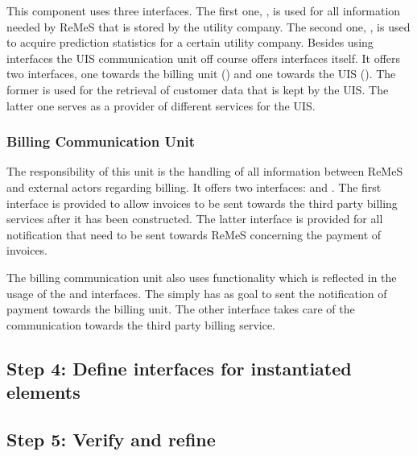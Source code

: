 \npar This component uses three interfaces. The first one, , is
used for all information needed by ReMeS that is stored by the utility
company. The second one, , is used to acquire prediction
statistics for a certain utility company. Besides using interfaces the UIS
communication unit off course offers interfaces itself. It offers two
interfaces, one towards the billing unit () and
one towards the UIS (). The former is used for the
retrieval of customer data that is kept by the UIS. The latter one serves as a
provider of different services for the UIS.

\subsubsection{Billing Communication Unit}

\npar The responsibility of this unit is the handling of all information between
ReMeS and external actors regarding billing. It offers two interfaces:
 and . The first
interface is provided to allow invoices to be sent towards the third party
billing services after it has been constructed. The latter interface is
provided for all notification that need to be sent towards ReMeS concerning the
payment of invoices. 

\npar The billing communication unit also uses functionality which is reflected
in the usage of the  and  interfaces.
The  simply has as goal to sent the notification of
payment towards the billing unit. The other interface takes care of the
communication towards the third party billing service.

\subsection{Step 4: Define interfaces for instantiated elements}
\label{add:it8/interfaces}

\paragraph{}

\subsection{Step 5: Verify and refine}
\label{add:it8/verification}